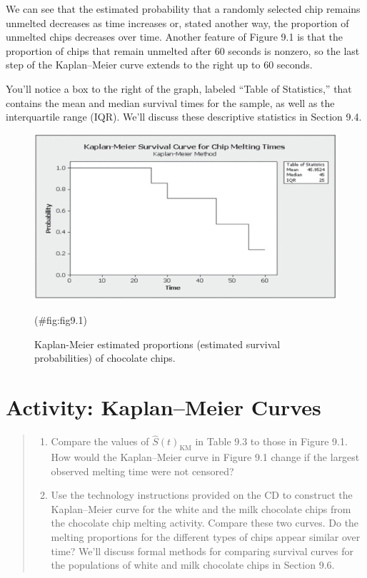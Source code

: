 \documentclass[
]{report}
\providecommand{\tightlist}{%
  \setlength{\itemsep}{0pt}\setlength{\parskip}{0pt}}
\begin{document}
We can see that the estimated probability that a randomly selected chip remains unmelted decreases as time increases or, stated another way, the proportion of unmelted chips decreases over time. Another feature of Figure 9.1 is that the proportion of chips that remain unmelted after 60 seconds is nonzero, so the last step of the Kaplan--Meier curve extends to the right up to 60 seconds.

You'll notice a box to the right of the graph, labeled ``Table of Statistics,'' that contains the mean and
median survival times for the sample, as well as the interquartile range (IQR). We'll discuss these descriptive
statistics in Section 9.4.

\begin{figure}

{\centering \includegraphics[width=1\linewidth]{docs/Fig9_1} 

}

\caption{Kaplan-Meier estimated proportions (estimated survival probabilities) of chocolate chips.}(\#fig:fig9.1)
\end{figure}

\section*{Activity: Kaplan--Meier Curves}\label{activity-kaplanmeier-curves}

\begin{quote}
\begin{enumerate}
\def\labelenumi{\arabic{enumi}.}
\setcounter{enumi}{17}
\tightlist
\item
  Compare the values of \(\hat S(t)_{\mathrm{KM}}\) in Table 9.3 to those in Figure 9.1. How would the Kaplan--Meier curve in Figure 9.1 change if the largest observed melting time were not censored?\\
\item
  Use the technology instructions provided on the CD to construct the Kaplan--Meier curve for the white and the milk chocolate chips from the chocolate chip melting activity. Compare these two curves. Do the melting proportions for the different types of chips appear similar over time? We'll discuss formal methods for comparing survival curves for the populations of white and milk chocolate chips in Section 9.6.
\end{enumerate}
\end{quote}
\end{document}
